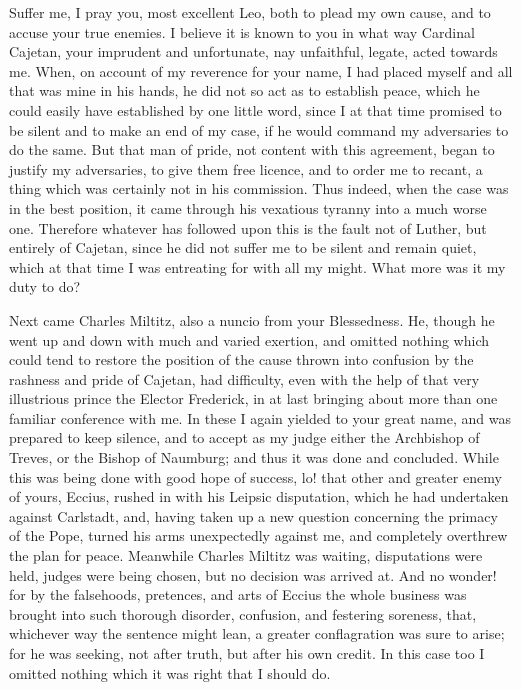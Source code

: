 Suffer me, I pray you, most excellent Leo, both to plead my own cause, and
to accuse your true enemies. I believe it is known to you in what way
Cardinal Cajetan, your imprudent and unfortunate, nay unfaithful, legate,
acted towards me. When, on account of my reverence for your name, I had
placed myself and all that was mine in his hands, he did not so act as to
establish peace, which he could easily have established by one little
word, since I at that time promised to be silent and to make an end of my
case, if he would command my adversaries to do the same. But that man of
pride, not content with this agreement, began to justify my adversaries,
to give them free licence, and to order me to recant, a thing which was
certainly not in his commission. Thus indeed, when the case was in the
best position, it came through his vexatious tyranny into a much worse
one. Therefore whatever has followed upon this is the fault not of Luther,
but entirely of Cajetan, since he did not suffer me to be silent and
remain quiet, which at that time I was entreating for with all my might.
What more was it my duty to do?

Next came Charles Miltitz, also a nuncio from your Blessedness. He, though
he went up and down with much and varied exertion, and omitted nothing
which could tend to restore the position of the cause thrown into
confusion by the rashness and pride of Cajetan, had difficulty, even with
the help of that very illustrious prince the Elector Frederick, in at last
bringing about more than one familiar conference with me. In these I again
yielded to your great name, and was prepared to keep silence, and to
accept as my judge either the Archbishop of Treves, or the Bishop of
Naumburg; and thus it was done and concluded. While this was being done
with good hope of success, lo! that other and greater enemy of yours,
Eccius, rushed in with his Leipsic disputation, which he had undertaken
against Carlstadt, and, having taken up a new question concerning the
primacy of the Pope, turned his arms unexpectedly against me, and
completely overthrew the plan for peace. Meanwhile Charles Miltitz was
waiting, disputations were held, judges were being chosen, but no decision
was arrived at. And no wonder! for by the falsehoods, pretences, and arts
of Eccius the whole business was brought into such thorough disorder,
confusion, and festering soreness, that, whichever way the sentence might
lean, a greater conflagration was sure to arise; for he was seeking, not
after truth, but after his own credit. In this case too I omitted nothing
which it was right that I should do.

